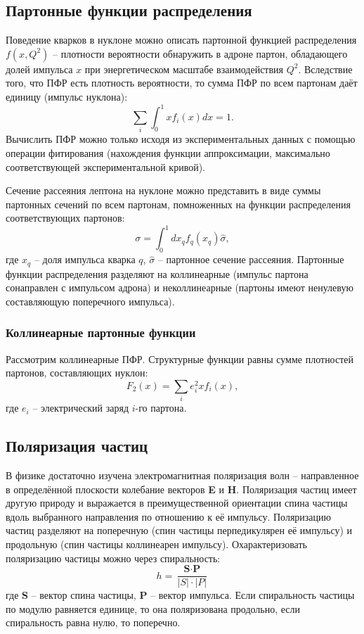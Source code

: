 \documentclass{extarticle}
\begin{document}
\subsection{Партонные функции распределения}
Поведение кварков в нуклоне можно описать партонной функцией распределения $f(x,Q^2)$ – плотности вероятности обнаружить в адроне партон, обладающего долей импульса $x$ при энергетическом масштабе взаимодействия $Q^2$. Вследствие того, что ПФР есть плотность вероятности, то сумма ПФР по всем партонам даёт единицу (импульс нуклона):
\begin{equation}
	\sum_i \int_0^1 x f_i(x)dx = 1.
\end{equation}
Вычислить ПФР можно только исходя из экспериментальных данных с помощью операции фитирования (нахождения функции аппроксимации, максимально соответствующей экспериментальной кривой). 

Сечение рассеяния лептона на нуклоне можно представить в виде суммы партонных сечений по всем партонам, помноженных на функции распределения соответствующих партонов:
\begin{equation}
	\sigma = \int_0^1 dx_q f_q(x_q) \hat{\sigma},
\end{equation}
где $x_q$ -- доля импульса кварка $q$, $\hat{\sigma}$ -- партонное сечение рассеяния.
Партонные функции распределения разделяют на коллинеарные (импульс партона сонаправлен с импульсом адрона) и неколлинеарные (партоны имеют ненулевую составляющую поперечного импульса).
\subsubsection{Коллинеарные партонные функции}
Рассмотрим коллинеарные ПФР. Структурные функции равны сумме плотностей партонов, составляющих нуклон:
\begin{equation}
F_2(x) = \sum_i e^2_i x f_i(x),
\end{equation}
где $e_i$ -- электрический заряд $i$-го партона.



\newpage
\subsection{Поляризация частиц}

 В физике достаточно изучена электромагнитная поляризация волн – направленное в определённой плоскости колебание векторов \textbf{E} и \textbf{H}. Поляризация частиц имеет другую природу и выражается в преимущественной ориентации спина частицы вдоль выбранного направления по отношению к её импульсу. Поляризацию частиц разделяют на поперечную (спин частицы перпедикулярен её импульсу) и продольную (спин частицы коллинеарен импульсу). 
 Охарактеризовать поляризацию частицы можно через спиральность:
 \begin{equation}
     h = \frac{\textbf{S} \cdot \textbf{P}}{|S|\cdot |P|}
 \end{equation}
где \textbf{S} – вектор спина частицы, \textbf{P} – вектор импульса. Если спиральность частицы по модулю равняется единице, то она поляризована продольно, если спиральность равна нулю, то поперечно. 
\end{document}
